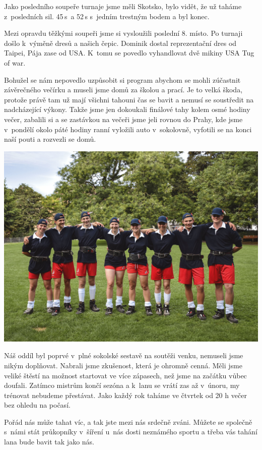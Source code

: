 \documentclass[11pt]{article}
\begin{document}
Jako posledního soupeře turnaje jsme měli Skotsko, bylo vidět, že už taháme z~posledních sil. 45\,s~a 52\,s s~jedním trestným bodem a byl konec.

Mezi opravdu těžkými soupeři jsme si vysloužili poslední 8. místo. Po turnaji došlo k~výměně dresů a našich čepic. Dominik dostal reprezentační dres od Taipei, Pája zase od USA. K~tomu se povedlo vyhandlovat dvě mikiny USA Tug of war.

Bohužel se nám nepovedlo uzpůsobit si program abychom se mohli zúčastnit závěrečného večírku a museli jsme domů za školou a prací. Je to velká škoda, protože právě tam už mají všichni tahouni čas se bavit a nemusí se soustředit na nadcházející výkony. Takže jsme jen dokoukali finálové tahy kolem osmé hodiny večer, zabalili si a se zastávkou na večeři jsme jeli rovnou do Prahy, kde jsme v~pondělí okolo páté hodiny ranní vyložili auto v~sokolovně, vyfotili se na konci naší pouti a rozvezli se domů.

\begin{center}
  \includegraphics[width=\linewidth]{./lano-team-2.jpg}
\end{center}

Náš oddíl byl poprvé v~plné sokolské sestavě na soutěži venku, nemuseli jsme nikým doplňovat. Nabrali jsme zkušenost, která je ohromně cenná. Měli jsme veliké štěstí na možnost startovat ve více zápasech, než jsme na začátku vůbec doufali. Zatímco mistrům končí sezóna a k~lanu se vrátí zas až v~únoru, my trénovat nebudeme přestávat. Jako každý rok taháme ve čtvrtek od 20 h večer bez ohledu na počasí. 

Pořád nás může tahat víc, a tak jste mezi nás srdečně zváni. Můžete se společně s~námi stát průkopníky v~šíření u~nás dosti neznámého sportu a třeba vás tahání lana bude bavit tak jako nás.
\end{document}
